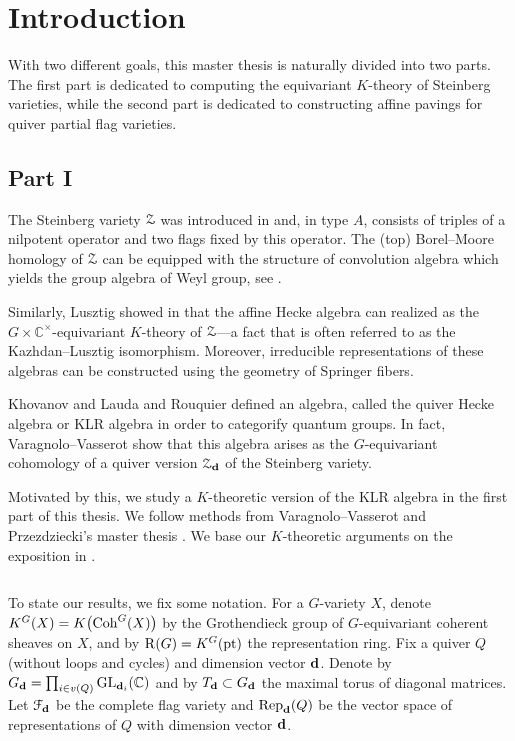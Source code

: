 \chapter*{Introduction}

With two different goals, this master thesis is naturally divided into two parts. The first part is dedicated to computing the equivariant $K$-theory of Steinberg varieties, while the second part is dedicated to constructing affine pavings for quiver partial flag varieties.

\section*{Part I}

The Steinberg variety $\operatorname{\mathcal{Z}}$ was introduced in \cite{steinberg1976desingularization} and, in type $A$, consists of triples of a nilpotent operator and two flags fixed by this operator. The (top) Borel--Moore homology of $\operatorname{\mathcal{Z}}$ can be equipped with the structure of convolution algebra which yields the group algebra of Weyl group, see \cite{kazhdan1980topological}.
 
Similarly, Lusztig showed in \cite{lusztig1985equivariant} that the affine Hecke algebra can realized as the $G \times \mathbb{C}^{\times}$-equivariant $K$-theory of $\operatorname{\mathcal{Z}}$—a fact that is often referred to as the Kazhdan–Lusztig isomorphism. Moreover, irreducible representations of these algebras can be constructed using the geometry of Springer fibers.

Khovanov and Lauda \cite{https://doi.org/10.48550/arxiv.0803.4121} and Rouquier \cite{https://doi.org/10.48550/arxiv.0812.5023} defined an algebra, called the quiver Hecke algebra or KLR algebra in order to categorify quantum groups. In fact, Varagnolo--Vasserot \cite{varagnolo2011canonical} show that this algebra arises as the $G$-equivariant cohomology of a quiver version $\operatorname{\mathcal{Z}}_{\mathbf{d}}$ of the Steinberg variety.

Motivated by this, we study a $K$-theoretic version of the KLR algebra in the first part of this thesis. We follow methods from Varagnolo--Vasserot \cite{varagnolo2011canonical} and Przezdziecki’s master thesis \cite{przezdziecki2015geometric}. We base our $K$-theoretic arguments on the exposition in \cite[Chapter 5]{chriss1997representation}.

$\,$

To state our results, we fix some notation. For a $G$-variety $X$, denote $K^G(X)=K\big(\!\operatorname{\operatorname{Coh}}^G(X)\big)$ by the Grothendieck group of $G$-equivariant coherent sheaves on $X$, and by $\operatorname{\operatorname{R}}(G)=K^G(\operatorname{\operatorname{pt}})$ the representation ring. Fix a quiver $Q$ (without loops and cycles) and dimension vector $\mathbf{d}$. Denote by $G_{\mathbf{d}}=\prod_{i \in v(Q)} \operatorname{\operatorname{GL}}_{\mathbf{d}_i}(\mathbb{C})$ and by $T_{\mathbf{d}} \subset G_{\mathbf{d}}$ the maximal torus of diagonal matrices. Let $\mathcal{F}_{\mathbf{d}}$ be the complete flag variety and $\operatorname{\operatorname{Rep}}_{\mathbf{d}}(Q)$ be the vector space of representations of $Q$ with dimension vector $\mathbf{d}$.

